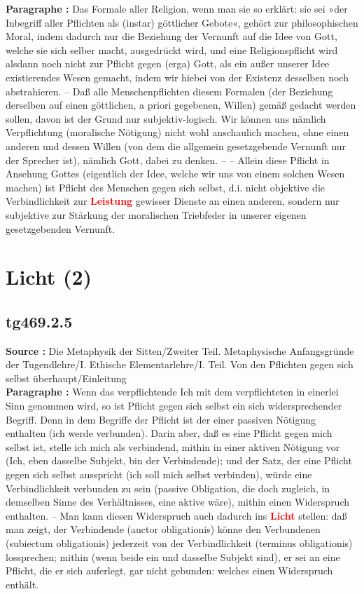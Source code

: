 \documentclass[a4paper,12pt,twoside]{book}
\newcommand{\match}[1]{\textcolor{red}{\textbf{#1}}}
\newcommand{\unnumberedsection}[1]{
	\section*{#1}
	\addcontentsline{toc}{section}{#1}
	\markright{#1}
}
\begin{document}
	\textbf{Paragraphe : }Das Formale aller Religion, wenn man sie so erklärt: sie sei »der Inbegriff aller Pflichten als (instar) göttlicher Gebote«, gehört zur philosophischen Moral, indem dadurch nur die Beziehung der Vernunft auf die Idee von Gott, welche sie sich selber macht, ausgedrückt wird, und eine Religionspflicht wird alsdann noch nicht zur Pflicht gegen (erga) Gott, als ein außer unserer Idee existierendes Wesen gemacht, indem wir hiebei von der Existenz desselben noch abstrahieren. – Daß alle Menschenpflichten diesem Formalen (der Beziehung derselben auf einen göttlichen, a priori gegebenen, Willen) gemäß gedacht werden sollen, davon ist der Grund nur subjektiv-logisch. Wir können uns nämlich Verpflichtung (moralische Nötigung) nicht wohl anschaulich machen, ohne einen anderen und dessen Willen (von dem die allgemein gesetzgebende Vernunft nur der Sprecher ist), nämlich Gott, dabei zu denken. – – Allein diese Pflicht in Ansehung Gottes (eigentlich der Idee, welche wir uns von einem solchen Wesen machen) ist Pflicht des Menschen gegen sich selbst, d.i. nicht objektive die Verbindlichkeit zur \match{Leistung} gewisser Dienste an einen anderen, sondern nur subjektive zur Stärkung der moralischen Triebfeder in unserer eigenen gesetzgebenden Vernunft. 
	
	\unnumberedsection{Licht (2)} 
	\subsection*{tg469.2.5} 
	\textbf{Source : }Die Metaphysik der Sitten/Zweiter Teil. Metaphysische Anfangsgründe der Tugendlehre/I. Ethische Elementarlehre/I. Teil. Von den Pflichten gegen sich selbst überhaupt/Einleitung\\  
	
	\textbf{Paragraphe : }Wenn das verpflichtende Ich mit dem verpflichteten in einerlei Sinn genommen wird, so ist Pflicht gegen sich selbst ein sich widersprechender Begriff. Denn in dem Begriffe der Pflicht ist der einer passiven Nötigung enthalten (ich werde verbunden). Darin aber, daß es eine Pflicht gegen mich selbst ist, stelle ich mich als verbindend, mithin in einer aktiven Nötigung vor (Ich, eben dasselbe Subjekt, bin der Verbindende); und der Satz, der eine Pflicht gegen sich selbst ausspricht (ich soll mich selbst verbinden), würde eine Verbindlichkeit verbunden zu sein (passive Obligation, die doch zugleich, in demselben Sinne des Verhältnisses, eine aktive wäre), mithin einen Widerspruch enthalten. – Man kann diesen Widerspruch auch dadurch ins \match{Licht} stellen: daß man zeigt, der Verbindende (auctor obligationis) könne den Verbundenen (subiectum obligationis) jederzeit von der Verbindlichkeit (terminus obligationis) lossprechen; mithin (wenn beide ein und dasselbe Subjekt sind), er sei an eine Pflicht, die er sich auferlegt, gar nicht gebunden: welches einen Widerspruch enthält. 
	
\end{document}
